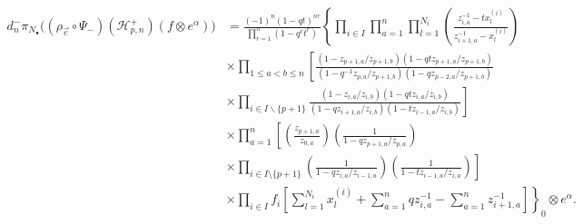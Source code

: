 \documentclass{amsart}
\theoremstyle{remark}
\numberwithin{thm}{section}
\numberwithin{equation}{section}
\begin{document}
\begin{align*}
d_n^-\pi_{N_\bullet}\biggl( \left( \rho_{\vec{c}}\circ\Psi_- \right)(\mathcal{H}_{p,n}^+)(f\otimes e^\alpha)\biggr)
&= \frac{(-1)^n\left(1- qt \right)^{nr}}{\prod_{r=1}^n\left(1- q^{r}t^{r} \right)}
\left\{\prod_{i\in I}\prod_{a=1}^n\prod_{l=1}^{N_i}\left(\frac{  z_{i,a}^{-1}-tx_{l}^{(i)} }{ z_{i+1,a}^{-1}-x_{l}^{(i)} }\right)\right.\\
&\times\prod_{1\le a<b\le n}\left[
\frac{\left(1-z_{p+1,a}/z_{p+1,b}\right)\left(1-qtz_{p+1,a}/z_{p+1,b}\right)}{\left(1-q^{-1}z_{p,a}/z_{p+1,b}\right)\left(1-qz_{p-2,a}/z_{p+1,b}\right)}\right.\\
&\times\left.
\prod_{i\in I\backslash\{p+1\}}
\frac{\left(1-z_{i,a}/z_{i,b}\right)\left(1-qtz_{i,a}/z_{i,b}\right)}{\left(1-qz_{i+1,a}/z_{i,b}\right)\left(1-tz_{i-1,a}/z_{i,b}\right)}\right]\\
&\times \prod_{a=1}^n
\left[
\left(\frac{z_{p+1,a}}{z_{0,a}}\right)
\left(\frac{1}
{1-qz_{p+1,a}/z_{p,a}}\right)\right.\\
&\left.\times\prod_{i\in I\setminus\{p+1\}}
 \left(\frac{1}{1-qz_{i,a}/z_{i-1,a}}\right)\left(\frac{1}{1-tz_{i-1,a}/z_{i,a}}\right) \right]\\
&\left.\times 
\prod_{i\in I}
f_i\left[ \sum_{l=1}^{N_i}  x_{l}^{(i)}+\sum_{a=1}^n qz_{i,a}^{-1}-\sum_{a=1}^n z_{i+1,a}^{-1} \right]\right\}_0\otimes e^\alpha.
\end{align*}
\end{document}

